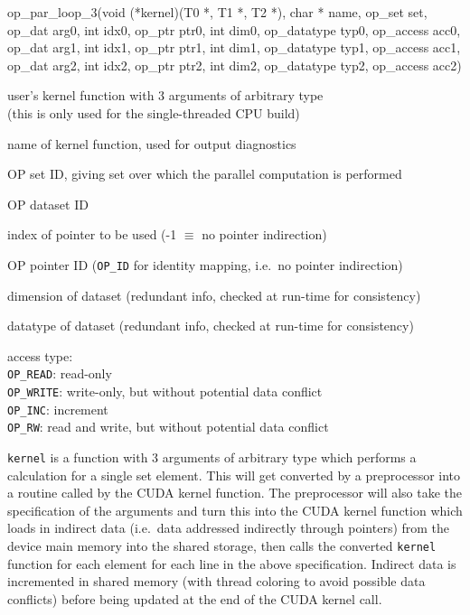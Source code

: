 \begin{routine} {op\_par\_loop\_3(void (*kernel)(T0 *, T1 *, T2 *), char * name, op\_set set,\\
\hspace*{0.13in}    op\_dat arg0, int idx0, op\_ptr ptr0, int dim0, op\_datatype typ0, op\_access acc0,\\
\hspace*{0.13in}    op\_dat arg1, int idx1, op\_ptr ptr1, int dim1, op\_datatype typ1, op\_access acc1,\\
\hspace*{0.13in}    op\_dat arg2, int idx2, op\_ptr ptr2, int dim2, op\_datatype typ2, op\_access acc2)}{}

\item[kernel]     user's kernel function with 3 arguments of arbitrary type\\
                  (this is only used for the single-threaded CPU build)
\item[name]       name of kernel function, used for output diagnostics
\item[set]        OP set ID, giving set over which the parallel computation is performed
\item[arg]        OP dataset ID
\item[idx]        index of pointer to be used (-1 $\equiv$ no pointer indirection)
\item[ptr]        OP pointer ID ({\tt OP\_ID} for identity mapping, i.e.~no pointer indirection)
\item[dim]        dimension of dataset (redundant info, checked at run-time for consistency)
\item[typ]        datatype of dataset (redundant info, checked at run-time for consistency)
\item[acc]        access type:\\
                  {\tt OP\_READ}: read-only\\ 
                  {\tt OP\_WRITE}: write-only, but without potential data conflict\\ 
                  {\tt OP\_INC}: increment\\ 
                  {\tt OP\_RW}:  read and write, but without potential data conflict
\end{routine}

{\tt kernel} is a function with 3 arguments of arbitrary type which performs
a calculation for a single set element.
This will get converted by a preprocessor into a routine called by the CUDA kernel 
function.  The preprocessor will also take the specification of the arguments and turn 
this into the CUDA kernel function which loads in indirect data (i.e.~data addressed 
indirectly through pointers) from the device main memory into the shared storage, 
then calls the converted {\tt kernel} function for each element for each line in 
the above specification.  Indirect data is incremented in shared memory (with
thread coloring to avoid possible data conflicts) before being updated at the end 
of the CUDA kernel call.

